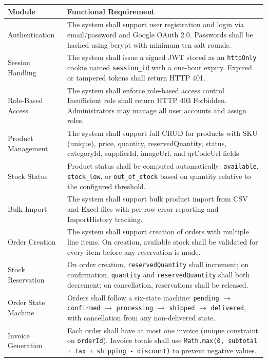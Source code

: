 \documentclass[12pt,a4paper]{report}
\begin{document}
\begin{longtable}{p{}p{}}
    \toprule
    \textbf{Module} & \textbf{Functional Requirement} \\
    \midrule
    \endhead
    Authentication & The system shall support user registration and login via email/password and Google OAuth 2.0. Passwords shall be hashed using bcrypt with minimum ten salt rounds. \\
    Session Handling & The system shall issue a signed JWT stored as an \texttt{httpOnly} cookie named \texttt{session\_id} with a one-hour expiry. Expired or tampered tokens shall return HTTP 401. \\
    Role-Based Access & The system shall enforce role-based access control. Insufficient role shall return HTTP 403 Forbidden. Administrators may manage all user accounts and assign roles. \\
    Product Management & The system shall support full CRUD for products with SKU (unique), price, quantity, reservedQuantity, status, categoryId, supplierId, imageUrl, and qrCodeUrl fields. \\
    Stock Status & Product status shall be computed automatically: \texttt{available}, \texttt{stock\_low}, or \texttt{out\_of\_stock} based on quantity relative to the configured threshold. \\
    Bulk Import & The system shall support bulk product import from CSV and Excel files with per-row error reporting and ImportHistory tracking. \\
    Order Creation & The system shall support creation of orders with multiple line items. On creation, available stock shall be validated for every item before any reservation is made. \\
    Stock Reservation & On order creation, \texttt{reservedQuantity} shall increment; on confirmation, \texttt{quantity} and \texttt{reservedQuantity} shall both decrement; on cancellation, reservations shall be released. \\
    Order State Machine & Orders shall follow a six-state machine: \texttt{pending} $\to$ \texttt{confirmed} $\to$ \texttt{processing} $\to$ \texttt{shipped} $\to$ \texttt{delivered}, with cancellation from any non-delivered state. \\
    Invoice Generation & Each order shall have at most one invoice (unique constraint on \texttt{orderId}). Invoice totals shall use \texttt{Math.max(0, subtotal + tax + shipping - discount)} to prevent negative values. \\

\end{longtable}
\end{document}

